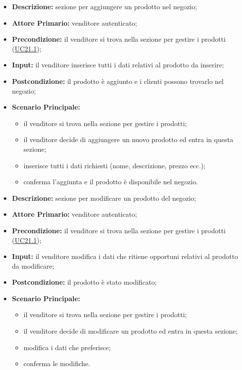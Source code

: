         \begin{itemize}
            \item \textbf{Descrizione:} sezione per aggiungere un prodotto nel negozio;
            \item \textbf{Attore Primario:} venditore autenticato;
            \item \textbf{Precondizione:} il venditore si trova nella sezione per gestire i prodotti (\hyperref[sec:UC21.1]{UC21.1});
            \item \textbf{Input:} il venditore inserisce tutti i dati relativi al prodotto da inserire;
            \item \textbf{Postcondizione:} il prodotto è aggiunto e i clienti possono trovarlo nel negozio;
            \item \textbf{Scenario Principale:} 
                \begin{itemize}
                    \item il venditore si trova nella sezione per gestire i prodotti;
                    \item il venditore decide di aggiungere un nuovo prodotto ed entra in questa sezione;
                    \item inserisce tutti i dati richiesti (nome, descrizione, prezzo ecc.);
                    \item conferma l'aggiunta e il prodotto è disponibile nel negozio.
                \end{itemize}
        \end{itemize}
        \begin{itemize}
            \item \textbf{Descrizione:} sezione per modificare un prodotto del negozio;
            \item \textbf{Attore Primario:} venditore autenticato;
            \item \textbf{Precondizione:} il venditore si trova nella sezione per gestire i prodotti (\hyperref[sec:UC21.1]{UC21.1});
            \item \textbf{Input:} il venditore modifica i dati che ritiene opportuni relativi al prodotto da modificare;
            \item \textbf{Postcondizione:} il prodotto è stato modificato;
            \item \textbf{Scenario Principale:} 
                \begin{itemize}
                    \item il venditore si trova nella sezione per gestire i prodotti;
                    \item il venditore decide di modificare un prodotto ed entra in questa sezione;
                    \item modifica i dati che preferisce;
                    \item conferma le modifiche.
                \end{itemize}
        \end{itemize}
